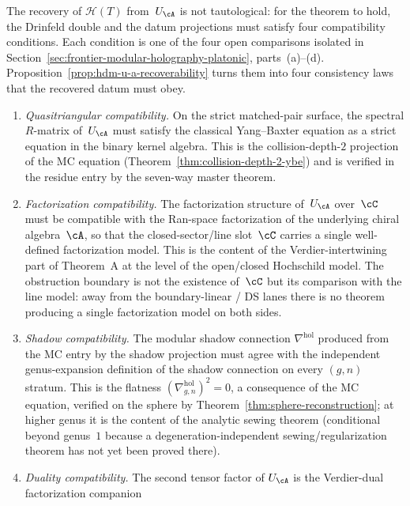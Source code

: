 \begin{remark}
\label{rem:hdm-four-consistency-conditions}
The recovery of $\mathcal{H}(T)$ from~$U_\cA$ is not tautological:
for the theorem to hold, the Drinfeld double and the datum projections
must satisfy four compatibility conditions. Each condition is one of the
four open comparisons isolated in
Section~\ref{sec:frontier-modular-holography-platonic}, parts~(a)--(d).
Proposition~\ref{prop:hdm-u-a-recoverability} turns them into four
consistency laws that the recovered datum must obey.
\begin{enumerate}[label=\textup{(C\arabic*)}]
\item \emph{Quasitriangular compatibility.} On the strict matched-pair
 surface, the spectral $R$-matrix of~$U_\cA$ must satisfy the classical
 Yang--Baxter equation as a strict equation in the binary kernel algebra.
 This is the collision-depth-$2$ projection
 of the MC equation
 (Theorem~\ref{thm:collision-depth-2-ybe}) and is verified in
 the residue entry by the seven-way master theorem.
\item \emph{Factorization compatibility.} The factorization
 structure of~$U_\cA$ over~$\cC$ must be compatible with the
 Ran-space factorization of the underlying chiral algebra~$\cA$,
 so that the closed-sector/line slot~$\cC$ carries a single well-defined
 factorization model. This is the content of the
 Verdier-intertwining part of Theorem~A at the level of the
 open/closed Hochschild model. The obstruction boundary is not the
 existence of~$\cC$ but its comparison with the line model: away from
 the boundary-linear / DS lanes there is no theorem producing a single
 factorization model on both sides.
\item \emph{Shadow compatibility.} The modular shadow connection
 $\nabla^{\mathrm{hol}}$ produced from the MC entry by the shadow
 projection must agree with the independent genus-expansion
 definition of the shadow connection on every $(g,n)$ stratum.
 This is the flatness
 $(\nabla^{\mathrm{hol}}_{g,n})^2 = 0$, a consequence of the MC
 equation, verified on the sphere by
 Theorem~\ref{thm:sphere-reconstruction}; at higher genus it is
 the content of the analytic sewing theorem
 (conditional beyond genus~$1$ because a degeneration-independent
 sewing/regularization theorem has not yet been proved there).
\item \emph{Duality compatibility.} The second tensor factor of
 $U_\cA$ is the Verdier-dual factorization companion

\end{enumerate}
\end{remark}
